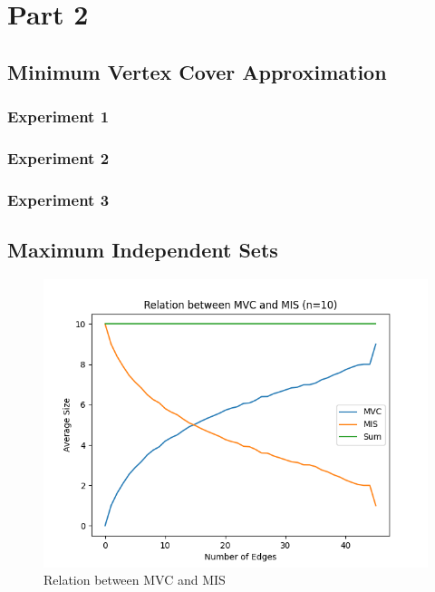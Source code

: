 \documentclass[titlepage]{article}
\begin{document}



\section{Part 2}

\subsection{Minimum Vertex Cover Approximation}

\subsubsection{Experiment 1}



\subsubsection{Experiment 2}



\subsubsection{Experiment 3}



\subsection{Maximum Independent Sets}

\begin{figure}[H]
    \centering
    \includegraphics[width=0.8\linewidth]{mvc_mis.png}
    \caption{Relation between MVC and MIS}
    \label{fig:mvc_mis}
\end{figure}
\end{document}
